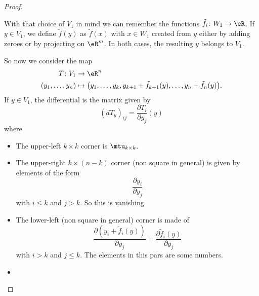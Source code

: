 \begin{proof}
\begin{subproof}
\begin{subproof}
                    With that choice of \( V_1\) in mind we can remember the functions \( \tilde f_i\colon W_1\to \eR\). If \( y\in V_1\), we define \( \tilde f(y)\) as \( \tilde f(x)\) with \( x\in W_1\) created from \( y\) either by adding zeroes or by projecting on \( \eR^m\). In both cases, the resulting \( y\) belongs to \( V_1\).

                    So now we consider the map
                    \begin{equation}        \label{EQooKEZOooSOTBlo}
                        \begin{aligned}
                            T\colon V_1&\to \eR^n \\
                            (y_1,\ldots, y_n)&\mapsto \big( y_1,\ldots, y_k,y_{k+1}+\tilde f_{k+1}(y),\ldots, y_n+\tilde f_n(y) \big). 
                        \end{aligned}
                    \end{equation}
                    If \( y\in V_1\), the differential is the matrix given by
                    \begin{equation}
                        (dT_y)_{ij}=\frac{ \partial T_i }{ \partial y_j }(y)
                    \end{equation}
                    where
                    \begin{itemize}
                        \item 
                    The upper-left \( k\times k\) corner is \( \mtu_{k\times k}\).
                \item
                    The upper-right \( k\times (n-k)\) corner (non square in general) is given by elements of the form
                    \begin{equation}
                        \frac{ \partial y_i }{ \partial y_{j} }
                    \end{equation}
                    with \( i\leq k\) and \( j>k\). So this is vanishing.
                \item
                    The lower-left (non square in general) corner is made of
                    \begin{equation}
                        \frac{ \partial (y_i+\tilde f_i(y)) }{ \partial y_j }=\frac{ \partial \tilde f_i(y) }{ \partial y_j }
                    \end{equation}
                    with \( i>k\) and \( j\leq k\). The elements in this pars are some numbers.
                \item

\end{itemize}
\end{subproof}
\end{subproof}
\end{proof}
